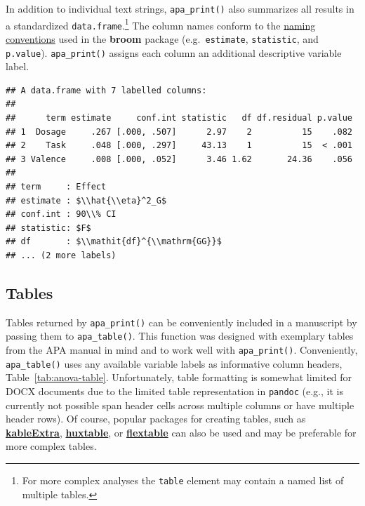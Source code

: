 \documentclass[
  english,
  ,man,floatsintext]{apa6}
\newenvironment{Shaded}{\begin{snugshade}}{\end{snugshade}}
\newcommand{\DecValTok}[1]{\textcolor[rgb]{0.00,0.00,0.81}{#1}}
\newcommand{\FunctionTok}[1]{\textcolor[rgb]{0.13,0.29,0.53}{\textbf{#1}}}
\newcommand{\NormalTok}[1]{#1}
\newcommand{\SpecialCharTok}[1]{\textcolor[rgb]{0.81,0.36,0.00}{\textbf{#1}}}
\begin{document}
In addition to individual text strings, \texttt{apa\_print()} also summarizes all results in a standardized \texttt{data.frame}.\footnote{For more complex analyses the \texttt{table} element may contain a named list of multiple tables.}
The column names conform to the \href{https://www.tidymodels.org/learn/develop/broom/\#glossary}{naming conventions} used in the \textbf{broom} package (e.g.~\texttt{estimate}, \texttt{statistic}, and \texttt{p.value}).
\texttt{apa\_print()} assigns each column an additional descriptive variable label.

\begin{Shaded}
\end{Shaded}

\begin{verbatim}
## A data.frame with 7 labelled columns:
## 
##      term estimate     conf.int statistic   df df.residual p.value
## 1  Dosage     .267 [.000, .507]      2.97    2          15    .082
## 2    Task     .048 [.000, .297]     43.13    1          15  < .001
## 3 Valence     .008 [.000, .052]      3.46 1.62       24.36    .056
## 
## term     : Effect 
## estimate : $\\hat{\\eta}^2_G$ 
## conf.int : 90\\% CI 
## statistic: $F$ 
## df       : $\\mathit{df}^{\\mathrm{GG}}$ 
## ... (2 more labels)
\end{verbatim}

\subsection{Tables}\label{tables}

Tables returned by \texttt{apa\_print()} can be conveniently included in a manuscript by passing them to \texttt{apa\_table()}.
This function was designed with exemplary tables from the APA manual in mind and to work well with \texttt{apa\_print()}.
Conveniently, \texttt{apa\_table()} uses any available variable labels as informative column headers, Table~\ref{tab:anova-table}.
Unfortunately, table formatting is somewhat limited for DOCX documents due to the limited table representation in \texttt{pandoc} (e.g., it is currently not possible span header cells across multiple columns or have multiple header rows).
Of course, popular packages for creating tables, such as \href{https://haozhu233.github.io/kableExtra/}{\textbf{kableExtra}}, \href{https://hughjonesd.github.io/huxtable/}{\textbf{huxtable}}, or \href{https://ardata-fr.github.io/flextable-book/index.html}{\textbf{flextable}} can also be used and may be preferable for more complex tables.
\end{document}
